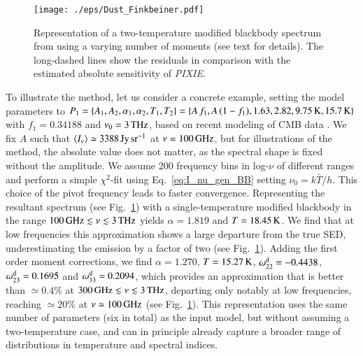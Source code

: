 \documentclass[usenatbib]{mn2e}
\begin{document}
\begin{figure}
\centering 
\texttt{[image: ./eps/Dust\_Finkbeiner.pdf]}
%
\caption{Representation of a two-temperature modified blackbody spectrum from \citet{Meisner2015} using a varying number of moments (see text for details). The long-dashed lines show the residuals in comparison with the estimated absolute sensitivity of {\it PIXIE}.}
\label{fig:mBB_2}
\end{figure}
To illustrate the method, let us consider a concrete example, setting the model parameters to $P_1=\{A_1, A_2, \alpha_1, \alpha_2, T_1, T_2\}=\{A\,f_1, A\,(1-f_1), 1.63, 2.82, 9.75\,{\rm K}, 15.7\,{\rm K}\}$ with $f_1=0.34188$ and $\nu_0=3\,{\rm THz}$, based on recent modeling of CMB data \citep{Meisner2015}. We fix $A$ such that $\left<I_\nu\right>\simeq 3388\,{\rm Jy\,sr^{-1}}$ at $\nu=100\,{\rm GHz}$, but for illustrations of the method, the absolute value does not matter, as the spectral shape is fixed without the amplitude. 
%
We assume 200 frequency bins in log-$\nu$ of different ranges and perform a simple $\chi^2$-fit using Eq.~\eqref{eq:I_nu_gen_BB} setting $\nu_0=k\bar{T}/h$. This choice of the pivot frequency leads to faster convergence.
%
Representing the resultant spectrum (see Fig.~\ref{fig:mBB_2}) with a single-temperature modified blackbody in the range $100\,{\rm GHz}\lesssim \nu\lesssim 3\,{\rm THz}$ yields $\alpha=1.819$ and $T=18.45\,{\rm K}$. 
%
We find that at low frequencies this approximation shows a large departure from the true SED, underestimating the emission by a factor of two (see Fig.~\ref{fig:mBB_2}). Adding the first order moment corrections, we find $\alpha=1.270$, $T=15.27\,{\rm K}$, $\omega^{\rm d}_{22}=-0.4438$, $\omega^{\rm d}_{23}=0.1695$ and $\omega^{\rm d}_{33}=0.2094$, which provides an approximation that is better than $\simeq 0.4\%$ at $300\,{\rm GHz}\lesssim \nu\lesssim 3\,{\rm THz}$, departing only notably at low frequencies, reaching $\simeq 20\%$ at $\nu\simeq 100\,{\rm GHz}$ (see Fig.~\ref{fig:mBB_2}). This representation uses the same number of parameters (six in total) as the input model, but without assuming a two-temperature case, and can in principle already capture a broader range of distributions in temperature and spectral indices.
\end{document}
